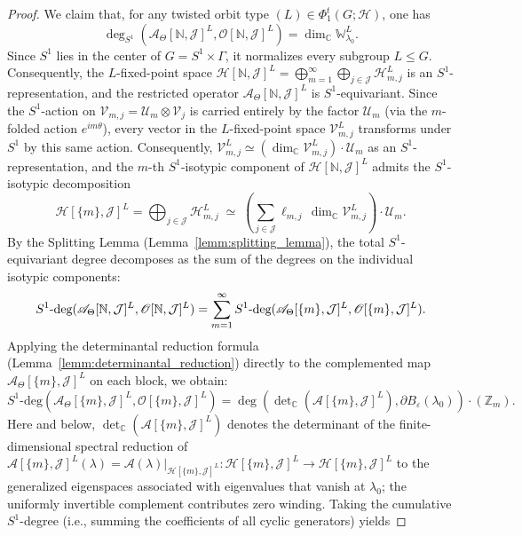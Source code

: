 \documentclass[twoside,11pt]{article}
\def\bc{{\mathbb{C}}}
\def\bn{{\mathbb{N}}}
\def\bz{{\mathbb{Z}}}
\def\s1deg{S^1\text{\rm -deg}}
\begin{document}
\begin{proof}
We claim that, for any twisted orbit type $(L) \in \Phi_1^t(G; \mathscr H)$, one has
\begin{equation}\label{eq:cumulative_identity}
\deg_{S^1}(\mathscr A_\Theta[\bn, \mathcal J]^L, \mathscr O[\bn, \mathcal J]^L) = \dim_\bc \mathbb{W}_{\lambda_0}^L.
\end{equation}
Since $S^1$ lies in the center of $G = S^1 \times \Gamma$, it normalizes every subgroup $L \leq G$. Consequently, the $L$-fixed-point space $\mathscr H[\bn, \mathcal J]^L =\bigoplus_{m=1}^\infty \bigoplus_{j \in \mathcal J} \mathscr H_{m,j}^L$ is an $S^1$-representation, and the restricted operator $\mathscr A_\Theta[\bn, \mathcal J]^L$ is $S^1$-equivariant. 
Since the $S^1$-action on $\mathcal V_{m,j} = \mathcal U_m \otimes \mathcal V_j$ is carried entirely by the factor $\mathcal U_m$ (via the $m$-folded action $e^{im\theta}$), every vector in the $L$-fixed-point space $\mathcal V_{m,j}^L$ transforms under $S^1$ by this same action. Consequently, $\mathcal V_{m,j}^L \simeq (\dim_\bc \mathcal V_{m,j}^L) \cdot \mathcal U_m$ as an $S^1$-representation, and the $m$-th $S^1$-isotypic component of $\mathscr H[\bn, \mathcal J]^L$ admits the $S^1$-isotypic decomposition
\[
\mathscr H[\{m\}, \mathcal J]^L =\bigoplus_{j \in \mathcal J} \mathscr H_{m,j}^L \;\simeq\;  \left( \sum_{j \in \mathcal J} \ell_{m,j}\, \dim_\bc \mathcal V_{m,j}^L\right) \cdot \mathcal U_m.
\]
By the Splitting Lemma (Lemma~\ref{lemm:splitting_lemma}), the total $S^1$-equivariant degree decomposes as the sum of the degrees on the individual isotypic components:
\begin{equation*}
\s1deg(\mathscr A_\Theta[\bn, \mathcal J]^L, \mathscr O[\bn, \mathcal J]^L) = \sum_{m=1}^\infty \s1deg(\mathscr A_\Theta[\{m\}, \mathcal J]^L, \mathscr O[\{m\}, \mathcal J]^L).
\end{equation*}
Applying the determinantal reduction formula (Lemma~\ref{lemm:determinantal_reduction}) directly to the complemented map $\mathscr A_\Theta[\{m\}, \mathcal J]^L$ on each block, we obtain:
\begin{equation*} 
S^1\text{-deg}(\mathscr A_\Theta[\{m\}, \mathcal J]^L, \mathscr O[\{m\}, \mathcal J]^L) = \deg(\det\nolimits_\bc(\mathscr A[\{m\}, \mathcal J]^L), \partial B_\varepsilon(\lambda_0)) \cdot (\bz_m).
\end{equation*}
Here and below, $\det_\bc(\mathscr A[\{m\}, \mathcal J]^L)$ denotes the determinant of the finite-dimensional spectral reduction of $\mathscr A[\{m\}, \mathcal J]^L(\lambda) = \mathscr A(\lambda)|_{\mathscr H[\{m\}, \mathcal J]^L}: \mathscr H[\{m\}, \mathcal J]^L \to \mathscr H[\{m\}, \mathcal J]^L$ to the generalized eigenspaces associated with eigenvalues that vanish at $\lambda_0$; the uniformly invertible complement contributes zero winding. Taking the cumulative $S^1$-degree (i.e., summing the coefficients of all cyclic generators) yields

\end{proof}
\end{document}
